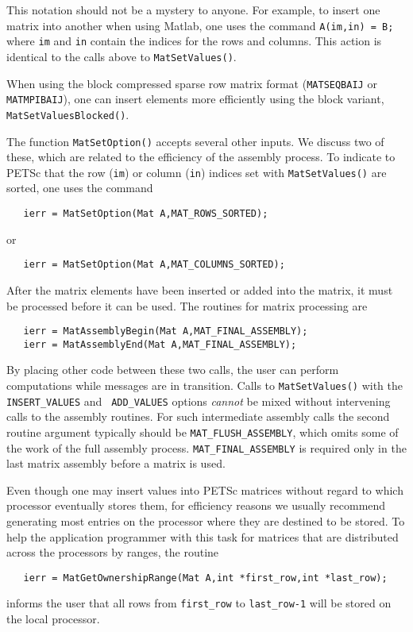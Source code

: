 This notation should not be a mystery to anyone. For example, 
to insert one matrix into another when using Matlab, one uses the command 
{\tt A(im,in) = B;} where {\tt im} and {\tt in} contain the indices for the
rows and columns. This action is identical to the calls above to 
{\tt MatSetValues()}.

When using the block compressed sparse row matrix format ({\tt MATSEQBAIJ} or
{\tt MATMPIBAIJ}), one can insert elements more efficiently using the block
variant, {\tt MatSetValuesBlocked()}. 

The function {\tt MatSetOption()} accepts several other inputs.  We
discuss two of these, which are related to the efficiency of the
assembly process.  To indicate to PETSc that the row ({\tt im}) or
column ({\tt in}) indices set with {\tt MatSetValues()} are sorted,
one uses the command  
\begin{verbatim}
   ierr = MatSetOption(Mat A,MAT_ROWS_SORTED);
\end{verbatim}
or 
\begin{verbatim}
   ierr = MatSetOption(Mat A,MAT_COLUMNS_SORTED);
\end{verbatim}

After the matrix elements have been inserted or added into the matrix, 
it must be processed before it can be used. The routines for matrix
processing are  
\begin{verbatim}
   ierr = MatAssemblyBegin(Mat A,MAT_FINAL_ASSEMBLY);
   ierr = MatAssemblyEnd(Mat A,MAT_FINAL_ASSEMBLY);
\end{verbatim}
By placing other code between these two calls, the user can perform
computations while messages are in transition.
Calls to {\tt MatSetValues()} with the {\tt INSERT\_VALUES} and {\tt
ADD\_VALUES} options {\em cannot} be mixed without intervening calls to
the assembly routines.  For such intermediate assembly calls the
second routine argument  typically should be {\tt MAT\_FLUSH\_ASSEMBLY},
 which omits some of the work of the full 
assembly process.  {\tt MAT\_FINAL\_ASSEMBLY}  is
required only in the last matrix assembly before a matrix is used.

Even though one may insert values into PETSc matrices without regard
to which processor eventually stores them, for efficiency
reasons we usually recommend generating most entries on the
processor where they are destined to be stored.  To help the
application programmer with this task for matrices that are
distributed across the processors by ranges, the routine
\begin{verbatim}
   ierr = MatGetOwnershipRange(Mat A,int *first_row,int *last_row);
\end{verbatim}
informs the user that all rows from {\tt first\_row} to 
{\tt last\_row-1} will be stored on the local processor.

